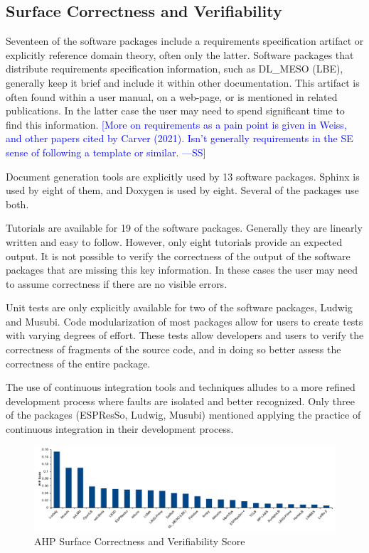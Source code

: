 \documentclass[final, 3p, times, authoryear]{elsarticle}
\newcommand{\authornote}[3]{\textcolor{#1}{[#3 ---#2]}}
\newcommand{\authornote}[3]{}
\newcommand{\wss}[1]{\authornote{blue}{SS}{#1}} %
\begin{document}
\subsection{Surface Correctness and Verifiability}

Seventeen of the software packages include a requirements specification artifact
or explicitly reference domain theory, often only the latter. Software packages
that distribute requirements specification information, such as DL\_MESO (LBE),
generally keep it brief and include it within other documentation. This artifact
is often found within a user manual, on a web-page, or is mentioned in related
publications. In the latter case the user may need to spend significant time to
find this information.  \wss{More on requirements as a pain point is given in
Weiss, and other papers cited by Carver (2021).  Isn't generally requirements in
the SE sense of following a template or similar.}

Document generation tools are explicitly used by 13 software packages. Sphinx is
used by eight of them, and Doxygen is used by eight. Several of the packages use
both.

Tutorials are available for 19 of the software packages. Generally they are
linearly written and easy to follow. However, only eight tutorials provide an
expected output. It is not possible to verify the correctness of the output of
the software packages that are missing this key information. In these cases the
user may need to assume correctness if there are no visible errors.

Unit tests are only explicitly available for two of the software packages,
Ludwig and Musubi. Code modularization of most packages allow for users to create tests with varying degrees of effort. These tests allow developers and users to verify the correctness of fragments of the source code, and in doing so better assess the correctness of the entire package.

The use of continuous integration tools and techniques alludes to a more refined
development process where faults are isolated and better recognized. Only three of the packages (ESPResSo, Ludwig, Musubi) mentioned applying the practice of continuous integration in their development process. 

\begin{figure}[h!]
	\begin{center}
		\includegraphics[width=1.0\textwidth]{./figures/correctnessverifiability.pdf}
		\caption{AHP Surface Correctness and Verifiability Score}
		\label{Fig_CorrectnessVerifiability}
	\end{center}
\end{figure}
\end{document}
